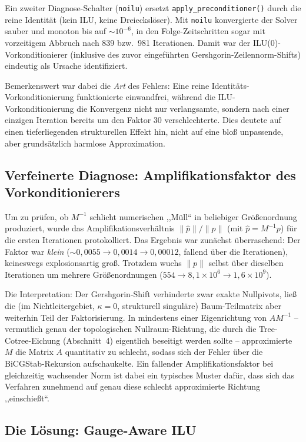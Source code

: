 \documentclass[11pt,a4paper]{article}
\begin{document}
Ein zweiter Diagnose-Schalter (\texttt{noilu}) ersetzt \texttt{apply\_preconditioner()} durch die reine Identität (kein ILU, keine Dreieckslöser). Mit \texttt{noilu} konvergierte der Solver sauber und monoton bis auf $\sim 10^{-6}$, in den Folge-Zeitschritten sogar mit vorzeitigem Abbruch nach 839 bzw.\ 981 Iterationen. Damit war der ILU(0)-Vorkonditionierer (inklusive des zuvor eingeführten Gershgorin-Zeilennorm-Shifts) eindeutig als Ursache identifiziert.

Bemerkenswert war dabei die \emph{Art} des Fehlers: Eine reine Identitäts-Vorkonditionierung funktionierte einwandfrei, während die ILU-Vorkonditionierung die Konvergenz nicht nur verlangsamte, sondern nach einer einzigen Iteration bereits um den Faktor $30$ verschlechterte. Dies deutete auf einen tieferliegenden strukturellen Effekt hin, nicht auf eine bloß unpassende, aber grundsätzlich harmlose Approximation.

\subsection{Verfeinerte Diagnose: Amplifikationsfaktor des Vorkonditionierers}

Um zu prüfen, ob $M^{-1}$ schlicht numerischen ,,Müll`` in beliebiger Größenordnung produziert, wurde das Amplifikationsverhältnis $\|\hat p\|/\|p\|$ (mit $\hat p = M^{-1} p$) für die ersten Iterationen protokolliert. Das Ergebnis war zunächst überraschend: Der Faktor war \emph{klein} ($\sim 0{,}0055 \to 0{,}0014 \to 0{,}00012$, fallend über die Iterationen), keineswegs explosionsartig groß. Trotzdem wuchs $\|p\|$ selbst über dieselben Iterationen um mehrere Größenordnungen ($554 \to 8{,}1\times 10^6 \to 1{,}6\times 10^9$).

Die Interpretation: Der Gershgorin-Shift verhinderte zwar exakte Nullpivots, ließ die (im Nichtleitergebiet, $\kappa = 0$, strukturell singuläre) Baum-Teilmatrix aber weiterhin Teil der Faktorisierung. In mindestens einer Eigenrichtung von $A M^{-1}$ -- vermutlich genau der topologischen Nullraum-Richtung, die durch die Tree-Cotree-Eichung (Abschnitt~4) eigentlich beseitigt werden sollte -- approximierte $M$ die Matrix $A$ quantitativ zu schlecht, sodass sich der Fehler über die BiCGStab-Rekursion aufschaukelte. Ein fallender Amplifikationsfaktor bei gleichzeitig wachsender Norm ist dabei ein typisches Muster dafür, dass sich das Verfahren zunehmend auf genau diese schlecht approximierte Richtung ,,einschießt``.

\subsection{Die Lösung: Gauge-Aware ILU}
\end{document}
